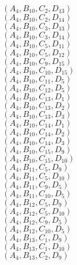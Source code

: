 \documentclass[14pt]{article}
\begin{document}
    $({A}_{4}, {B}_{10}, {C}_{2}, {D}_{13}) $ \\ 
    $({A}_{4}, {B}_{10}, {C}_{2}, {D}_{14}) $ \\ 
    $({A}_{4}, {B}_{10}, {C}_{3}, {D}_{13}) $ \\ 
    $({A}_{4}, {B}_{10}, {C}_{3}, {D}_{14}) $ \\ 
    $({A}_{4}, {B}_{10}, {C}_{5}, {D}_{11}) $ \\ 
    $({A}_{4}, {B}_{10}, {C}_{5}, {D}_{12}) $ \\ 
    $({A}_{4}, {B}_{10}, {C}_{9}, {D}_{15}) $ \\ 
    $({A}_{4}, {B}_{10}, {C}_{10}, {D}_{15}) $ \\ 
    $({A}_{4}, {B}_{10}, {C}_{11}, {D}_{5}) $ \\ 
    $({A}_{4}, {B}_{10}, {C}_{12}, {D}_{5}) $ \\ 
    $({A}_{4}, {B}_{10}, {C}_{13}, {D}_{1}) $ \\ 
    $({A}_{4}, {B}_{10}, {C}_{13}, {D}_{2}) $ \\ 
    $({A}_{4}, {B}_{10}, {C}_{13}, {D}_{3}) $ \\ 
    $({A}_{4}, {B}_{10}, {C}_{14}, {D}_{1}) $ \\ 
    $({A}_{4}, {B}_{10}, {C}_{14}, {D}_{2}) $ \\ 
    $({A}_{4}, {B}_{10}, {C}_{14}, {D}_{3}) $ \\ 
    $({A}_{4}, {B}_{10}, {C}_{15}, {D}_{9}) $ \\ 
    $({A}_{4}, {B}_{10}, {C}_{15}, {D}_{10}) $ \\ 
    $({A}_{4}, {B}_{11}, {C}_{5}, {D}_{9}) $ \\ 
    $({A}_{4}, {B}_{11}, {C}_{5}, {D}_{10}) $ \\ 
    $({A}_{4}, {B}_{11}, {C}_{9}, {D}_{5}) $ \\ 
    $({A}_{4}, {B}_{11}, {C}_{10}, {D}_{5}) $ \\ 
    $({A}_{4}, {B}_{12}, {C}_{5}, {D}_{9}) $ \\ 
    $({A}_{4}, {B}_{12}, {C}_{5}, {D}_{10}) $ \\ 
    $({A}_{4}, {B}_{12}, {C}_{9}, {D}_{5}) $ \\ 
    $({A}_{4}, {B}_{12}, {C}_{10}, {D}_{5}) $ \\ 
    $({A}_{4}, {B}_{13}, {C}_{1}, {D}_{9}) $ \\ 
    $({A}_{4}, {B}_{13}, {C}_{1}, {D}_{10}) $ \\ 
    $({A}_{4}, {B}_{13}, {C}_{2}, {D}_{9}) $ \\ 
\end{document}
